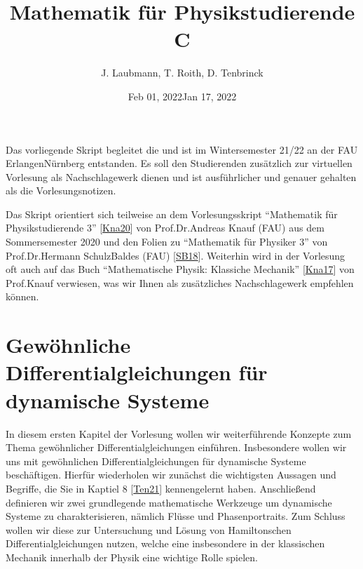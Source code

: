 \documentclass[letterpaper,10pt,english]{jupyterBook}
\title{Mathematik für Physikstudierende C}
\date{Feb 01, 2022}
\date{Jan 17, 2022}
\author{J.\@{} Laubmann, T.\@{} Roith, D.\@{} Tenbrinck}
\begin{document}
\pagestyle{empty}
\sphinxmaketitle
\pagestyle{plain}
\sphinxtableofcontents
\pagestyle{normal}
\label{\detokenize{intro::doc}}


\noindent{}

\sphinxAtStartPar
Das vorliegende Skript begleitet die  und ist im Wintersemester 21/22 an der FAU Erlangen\sphinxhyphen{}Nürnberg entstanden. Es soll den Studierenden zusätzlich zur virtuellen Vorlesung als Nachschlagewerk dienen und ist ausführlicher und genauer gehalten als die Vorlesungsnotizen.

\begin{DUlineblock}{0em}
\item[] 
\end{DUlineblock}

\sphinxAtStartPar
Das Skript orientiert sich teilweise an dem Vorlesungsskript “Mathematik für Physikstudierende 3” {[}\hyperlink{cite.references:id7}{Kna20}{]} von Prof.Dr.Andreas Knauf (FAU) aus dem Sommersemester 2020 und den Folien zu “Mathematik für Physiker 3” von Prof.Dr.Hermann Schulz\sphinxhyphen{}Baldes (FAU) {[}\hyperlink{cite.references:id10}{SB18}{]}. Weiterhin wird in der Vorlesung oft auch auf das Buch “Mathematische Physik: Klassiche Mechanik” {[}\hyperlink{cite.references:id8}{Kna17}{]} von Prof.Knauf verwiesen, was wir Ihnen als zusätzliches Nachschlagewerk empfehlen können.


\chapter{Gewöhnliche Differentialgleichungen für dynamische Systeme}
\label{\detokenize{ode/ode:gewohnliche-differentialgleichungen-fur-dynamische-systeme}}\label{\detokenize{ode/ode::doc}}
\sphinxAtStartPar
In diesem ersten Kapitel der Vorlesung wollen wir weiterführende Konzepte zum Thema gewöhnlicher Differentialgleichungen einführen.
Insbesondere wollen wir uns mit gewöhnlichen Differentialgleichungen für dynamische Systeme beschäftigen.
Hierfür wiederholen wir zunächst die wichtigsten Aussagen und Begriffe, die Sie in Kaptiel 8 {[}\hyperlink{cite.references:id12}{Ten21}{]} kennengelernt haben.
Anschließend definieren wir zwei grundlegende mathematische Werkzeuge um dynamische Systeme zu charakterisieren, nämlich Flüsse und Phasenportraits.
Zum Schluss wollen wir diese zur Untersuchung und Lösung von Hamiltonschen Differentialgleichungen nutzen, welche eine insbesondere in der klassischen Mechanik innerhalb der Physik eine wichtige Rolle spielen.
\end{document}
